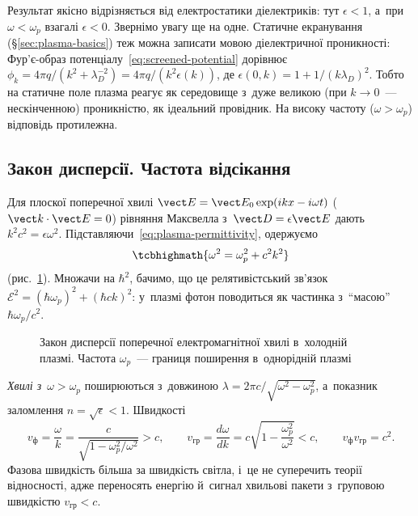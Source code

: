 Результат якісно відрізняється від електростатики діелектриків: тут $\epsilon<1$, а~при
$\omega<\omega_p$ взагалі $\epsilon<0$. Звернімо увагу ще на одне. Статичне екранування
(§\ref{sec:plasma-basics}) теж можна записати мовою діелектричної проникності: Фур'є-образ
потенціалу~\eqref{eq:screened-potential} дорівнює $\phi_k=4\pi
	q/(k^2+\lambda_D^{-2})=4\pi q/(k^2\epsilon(k))$, де
$\epsilon(0,k)=1+1/(k\lambda_D)^2$. Тобто на статичне поле плазма реагує як середовище
з~дуже великою (при $k\to0$~--- нескінченною) проникністю, як ідеальний провідник. На
високу частоту ($\omega>\omega_p$) відповідь протилежна.



\subsection*{Закон дисперсії. Частота відсікання}



Для плоскої поперечної хвилі $\vect E=\vect E_0\exp(ikx-i\omega t)$ ($\vect k\cdot\vect
	E=0$) рівняння Максвелла з~$\vect D=\epsilon\vect E$ дають
$k^2c^2=\epsilon\omega^2$. Підставляючи~\eqref{eq:plasma-permittivity}, одержуємо
\begin{equation}\label{eq:plasma-dispersion}
	\tcbhighmath{\omega^2=\omega_p^2+c^2k^2}
\end{equation}
(рис.~\ref{pic:plasma-dispersion}). Множачи на $\hbar^2$, бачимо, що це релятивістський
зв'язок $\mathcal E^2=(\hbar\omega_p)^2+(\hbar ck)^2$: у~плазмі фотон поводиться як
частинка з~\enquote{масою} $\hbar\omega_p/c^2$.

\begin{figure}[h!]\centering
	\caption{Закон дисперсії поперечної електромагнітної хвилі в~холодній плазмі. Частота
		$\omega_p$~--- границя поширення в~однорідній плазмі}
	\label{pic:plasma-dispersion}
\end{figure}

\emph{Хвилі з~$\omega>\omega_p$} поширюються з~довжиною $\lambda=2\pi
	c/\sqrt{\omega^2-\omega_p^2}$, а~показник заломлення $n=\sqrt\epsilon<1$. Швидкості
\begin{equation*}
	v_{\mathrm{ф}}=\frac\omega k=\frac c{\sqrt{1-\omega_p^2/\omega^2}}>c,\qquad
	v_{\mathrm{гр}}=\frac{d\omega}{dk}=c\sqrt{1-\frac{\omega_p^2}{\omega^2}}<c,\qquad
	v_{\mathrm{ф}}v_{\mathrm{гр}}=c^2.
\end{equation*}
Фазова швидкість більша за швидкість світла, і~це не суперечить теорії відносності, адже
переносять енергію й~сигнал хвильові пакети з~груповою швидкістю $v_{\mathrm{гр}}<c$.

